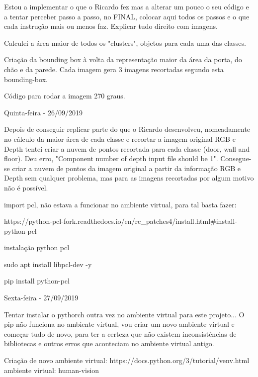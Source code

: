         Estou a implementar o que o Ricardo fez mas a alterar um pouco o seu código e a tentar perceber passo a passo, no FINAL, colocar aqui todos os passos e o que cada instrução mais ou menos faz. Explicar tudo direito com imagens.
        
        Calculei a área maior de todos os "clusters", objetos para cada uma das classes. 
        
        Criação da bounding box à volta da representação maior da área da porta, do chão e da parede.
        Cada imagem gera 3 imagens recortadas segundo esta bounding-box.
        
        Código para rodar a imagem 270 graus.
        
        
        \bigskip
        
        
        Quinta-feira - 26/09/2019
        
        Depois de conseguir replicar parte do que o Ricardo desenvolveu, nomeadamente no cálculo da maior área de cada classe e recortar a imagem original RGB e Depth tentei criar a nuvem de pontos recortada para cada classe (door, wall and floor). Deu erro, "Component number of depth input file should be 1". Consegue-se criar a nuvem de pontos da imagem original a partir da informação RGB e Depth sem qualquer problema, mas para as imagens recortadas por algum motivo não é possível.
        
        import pcl, não estava a funcionar no ambiente virtual, para tal basta fazer:
        
        https://python-pcl-fork.readthedocs.io/en/rc\_patches4/install.html\#install-python-pcl
     
        instalação python pcl
        
        sudo apt install libpcl-dev -y
        
        pip install python-pcl
        
        
        
        
        \bigskip
    
        Sexta-feira  - 27/09/2019
        
        Tentar instalar o pythorch outra vez no ambiente virtual para este projeto...
        O pip não funciona no ambiente virtual, vou criar um novo ambiente virtual e começar tudo de novo, para ter a certeza que não existem inconsistências de bibliotecas e outros erros que aconteciam no ambiente virtual antigo.
        
        Criação de novo ambiente virtual:
        https://docs.python.org/3/tutorial/venv.html
        ambiente virtual: human-vision
        
